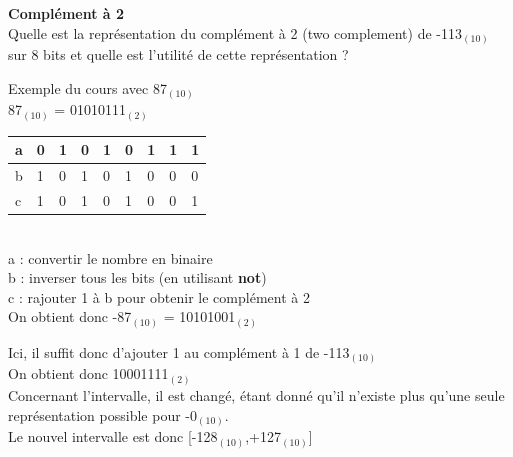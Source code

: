 \begin{Exercice}[5 minutes] \textbf{Complément à 2}\\
    Quelle est la représentation du complément à 2 (two complement) de -113$_{(10)}$ sur 8 bits et quelle est l'utilité de cette représentation ? \\

    \begin{conseil}
    
    Exemple du cours avec 87$_{(10)}$ \\
    
    87$_{(10)}$ = 01010111$_{(2)}$ \\
    
         \begin{tabular}{| p{1cm} | p{1cm} | p{1cm} | p{1cm} | p{1cm} | p{1cm} | p{1cm} | p{1cm} | p{1cm} |} 
            \hline
            a & 0 & 1 & 0 & 1 & 0 & 1 & 1 & 1 \\ [0.5ex] 
            \hline
            b & 1 & 0 & 1 & 0 & 1 & 0 & 0 & 0 \\ [0.5ex]
            \hline
            c & 1 & 0 & 1 & 0 & 1 & 0 & 0 & 1 \\ [0.5ex]
            \hline
        \end{tabular} \\
        
        a : convertir le nombre en binaire \\
        
        b : inverser tous les bits (en utilisant \textbf{not}) \\
        
        c : rajouter 1 à b pour obtenir le complément à 2 \\
        
        On obtient donc -87$_{(10)}$ = 10101001$_{(2)}$ \\
    \end{conseil}
    
    \begin{solution}
    	Ici, il suffit donc d'ajouter 1 au complément à 1 de -113$_{(10)}$ \\
    	
    	On obtient donc 10001111$_{(2)}$ \\
    	
    	Concernant l'intervalle, il est changé, étant donné qu'il n'existe plus qu'une seule représentation possible pour -0$_{(10)}$. \\
    	
    	Le nouvel intervalle est donc [-128$_{(10)}$,+127$_{(10)}$]
        
    \end{solution}
\end{Exercice}

